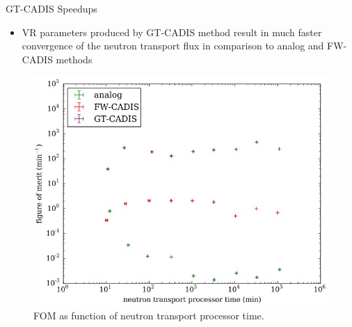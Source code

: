 \documentclass{beamer}
\begin{document}
\begin{frame}{GT-CADIS Speedups}
	\begin{itemize}
		\item{VR parameters produced by GT-CADIS method result in much
			faster convergence of the neutron transport flux in
			comparison to  analog and FW-CADIS methods}
	\end{itemize}
\begin{figure} 
	\includegraphics[scale=0.35]{gt_fom.jpg}
	\caption {FOM as function of neutron transport processor time.
	\cite{eb_thesis}}
\end{figure}

\end{frame}
\end{document}
